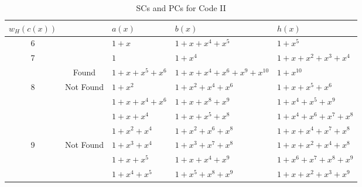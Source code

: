 \begin{table}[htbp]
		\caption{SCs and PCs for Code II}
		\centering
		\begin{tabularx}{0.75\textwidth}{|c|c|XXX} 
			\toprule
			$w_H(c(x))$&~& $a(x)$ & $b(x)$ & $h(x)$ \\ %
			\midrule
			6&~&$1+x$ & $1+x+x^{4}+x^5$ & $1+x^5$\\
			\cline{2-5}
			7&~&$1$ & $1+x^4$ & $1+x+x^2+x^3+x^4$\\
			\cline{1-5}
			&Found&$1+x+x^5+x^6$ & $1+x+x^4+x^6+x^9+x^{10}$ & $1+x^{10}$\\
			\cline{2-5}
			8&Not Found&$1+x^2$ 				&$1+x^2+x^4+x^6$ 		& $1+x+x^5+x^6$\\
			&~&$1+x+x^4+x^6$ 		&$1+x+x^8+x^9$			& $1+x^4+x^5+x^9$\\
			\cline{1-5}
			&&$1+x+x^4$ 		&$1+x+x^5+x^8$ 		& $1+x^4+x^6+x^7+x^8$\\
			&&$1+x^2+x^4$ 		&$1+x^2+x^6+x^8$ 		& $1+x+x^4+x^7+x^8$\\
			9&Not Found&$1+x^3+x^4$ 	&$1+x^3+x^7+x^8$ 		& $1+x+x^2+x^4+x^8$\\
			&&$1+x+x^5$ 		&$1+x+x^4+x^9$ 		& $1+x^6+x^7+x^8+x^9$\\
			&&$1+x^4+x^5$ 		&$1+x^5+x^8+x^9$ 		& $1+x+x^2+x^3+x^9$\\
			\bottomrule
		\end{tabularx}		
		\label{code-tables-2}
	\end{table}



